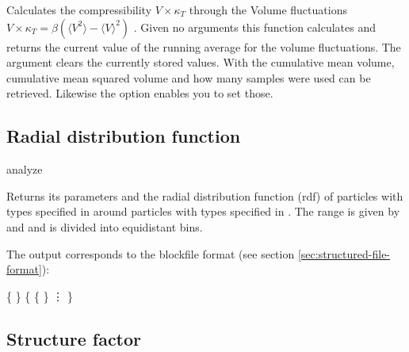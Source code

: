 Calculates the compressibility $V \times \kappa_T$ through the Volume fluctuations
$V \times \kappa_T = \beta \left(\langle V^2\rangle - \langle V \rangle^2\right)$ \cite{kolb99a}.
Given no arguments this function calculates and returns the current value of the
running average for the volume fluctuations.  
The argument  clears the currently stored values. With 
the cumulative mean volume, cumulative mean squared volume and how many samples were
used can be retrieved. Likewise the option  enables you to set those. 

\subsection{Radial distribution function}
\label{analyze:rdf}
\label{analyze:<rdf>}

\begin{pysyntax}
\end{pysyntax}

\begin{essyntax}
  analyze  
    
\end{essyntax}
Returns its parameters and the radial distribution function (rdf) of
particles with types specified in  around
particles with types specified in . The range
is given by  and  and is divided into
 equidistant bins.


The output corresponds to the blockfile format (see section
\vref{sec:structured-file-format}):
\begin{code}
\{  \} 
\{ 
  \{   \} 
  \vdots
\}
\end{code}

\subsection{Structure factor}
\label{analyze:structurefactor}

